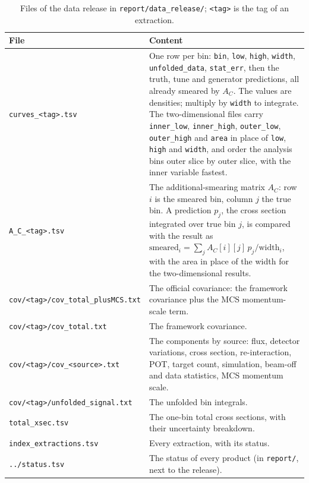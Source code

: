 \documentclass[11pt,a4paper]{article}
\begin{document}
\begin{table}[H]
  \centering
  \caption{Files of the data release in \texttt{report/data\_release/}; \texttt{<tag>} is the tag of an
    extraction.}
  \label{tab:release_schema}
  \footnotesize
  \begin{tabular}{@{}L{5.3cm}L{10.2cm}@{}}
    \toprule
    File & Content \\
    \midrule
    \texttt{curves\_<tag>.tsv} & One row per bin: \texttt{bin}, \texttt{low}, \texttt{high},
      \texttt{width}, \texttt{unfolded\_data}, \texttt{stat\_err}, then the truth, tune and generator
      predictions, all already smeared by $A_C$. The values are densities; multiply by \texttt{width}
      to integrate. The two-dimensional files carry \texttt{inner\_low}, \texttt{inner\_high},
      \texttt{outer\_low}, \texttt{outer\_high} and \texttt{area} in place of \texttt{low},
      \texttt{high} and \texttt{width}, and order the analysis bins outer slice by outer slice, with
      the inner variable fastest. \\
    \texttt{A\_C\_<tag>.tsv} & The additional-smearing matrix $A_C$: row $i$ is the smeared bin, column
      $j$ the true bin. A prediction $p_j$, the cross section integrated over true bin $j$, is
      compared with the result as $\mathrm{smeared}_i=\sum_j A_C[i][j]\,p_j/\mathrm{width}_i$, with
      the area in place of the width for the two-dimensional results. \\
    \texttt{cov/<tag>/cov\_total\_plusMCS.txt} & The official covariance: the framework covariance plus
      the MCS momentum-scale term. \\
    \texttt{cov/<tag>/cov\_total.txt} & The framework covariance. \\
    \texttt{cov/<tag>/cov\_<source>.txt} & The components by source: flux, detector variations, cross
      section, re-interaction, POT, target count, simulation, beam-off and data statistics, MCS
      momentum scale. \\
    \texttt{cov/<tag>/unfolded\_signal.txt} & The unfolded bin integrals. \\
    \texttt{total\_xsec.tsv} & The one-bin total cross sections, with their uncertainty breakdown. \\
    \texttt{index\_extractions.tsv} & Every extraction, with its status. \\
    \texttt{../status.tsv} & The status of every product (in \texttt{report/}, next to the release). \\
    \bottomrule
  \end{tabular}
\end{table}
\end{document}
